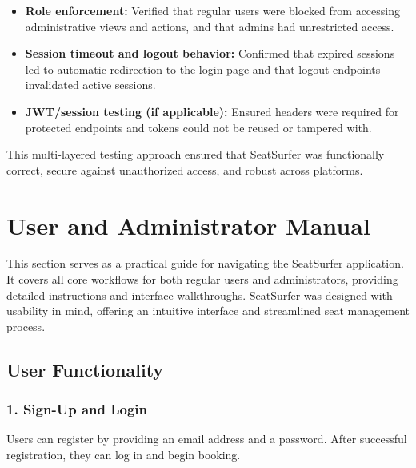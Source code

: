 \documentclass[12pt,a4paper]{report} %
\begin{document}
\begin{itemize}
    \item \textbf{Role enforcement:} Verified that regular users were blocked from accessing administrative views and actions, and that admins had unrestricted access.
    \item \textbf{Session timeout and logout behavior:} Confirmed that expired sessions led to automatic redirection to the login page and that logout endpoints invalidated active sessions.
    \item \textbf{JWT/session testing (if applicable):} Ensured headers were required for protected endpoints and tokens could not be reused or tampered with.
\end{itemize}

This multi-layered testing approach ensured that SeatSurfer was functionally correct, secure against unauthorized access, and robust across platforms.

\section{User and Administrator Manual}

This section serves as a practical guide for navigating the SeatSurfer application. It covers all core workflows for both regular users and administrators, providing detailed instructions and interface walkthroughs. SeatSurfer was designed with usability in mind, offering an intuitive interface and streamlined seat management process.

\subsection{User Functionality}

\subsubsection*{1. Sign-Up and Login}

Users can register by providing an email address and a password. After successful registration, they can log in and begin booking.
\end{document}
